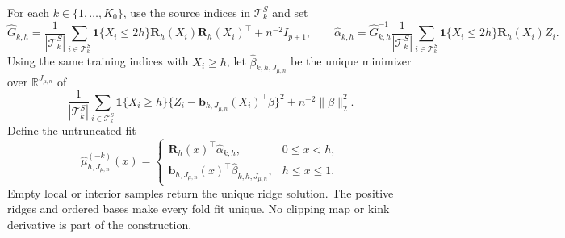 For each \(k\in\{1,\ldots,K_0\}\), use the source indices in \(\mathcal T^S_k\) and set
\[
\widehat G_{k,h}=\frac1{|\mathcal T^S_k|}\sum_{i\in\mathcal T^S_k}\mathbf 1\{X_i\le2h\}\mathbf R_h(X_i)\mathbf R_h(X_i)^\top+n^{-2}I_{p+1},
\qquad
\widehat\alpha_{k,h}=\widehat G_{k,h}^{-1}\frac1{|\mathcal T^S_k|}\sum_{i\in\mathcal T^S_k}\mathbf 1\{X_i\le2h\}\mathbf R_h(X_i)Z_i.
\]
Using the same training indices with \(X_i\ge h\), let \(\widehat\beta_{k,h,J_{\mu,n}}\) be the unique minimizer over \(\mathbb R^{J_{\mu,n}}\) of
\[
\frac1{|\mathcal T^S_k|}\sum_{i\in\mathcal T^S_k}\mathbf 1\{X_i\ge h\}\{Z_i-\mathbf b_{h,J_{\mu,n}}(X_i)^\top\beta\}^2+n^{-2}\|\beta\|_2^2.
\]
Define the untruncated fit
\[
\widehat\mu^{(-k)}_{h,J_{\mu,n}}(x)=
\begin{cases}
\mathbf R_h(x)^\top\widehat\alpha_{k,h},&0\le x<h,\\
\mathbf b_{h,J_{\mu,n}}(x)^\top\widehat\beta_{k,h,J_{\mu,n}},&h\le x\le1.
\end{cases}
\]
Empty local or interior samples return the unique ridge solution. The positive ridges and ordered bases make every fold fit unique. No clipping map or kink derivative is part of the construction.